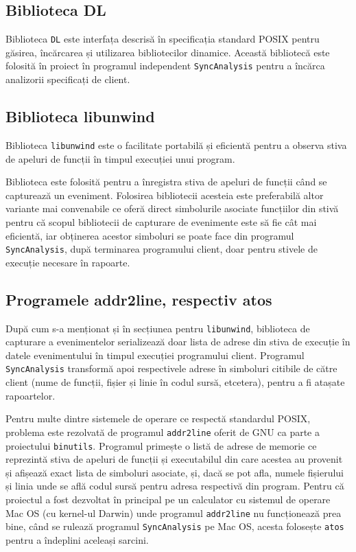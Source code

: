 \subsection{Biblioteca DL}

Biblioteca \lstinline{DL}\cite{DL} este interfața descrisă în
specificația standard POSIX pentru găsirea, încărcarea și utilizarea
bibliotecilor dinamice. Această bibliotecă este folosită în proiect în
programul independent \lstinline{SyncAnalysis} pentru a încărca
analizorii specificați de client.

\subsection{Biblioteca libunwind}

Biblioteca \lstinline{libunwind}\cite{libunwind} este o facilitate
portabilă și eficientă pentru a observa stiva de apeluri de funcții în
timpul execuției unui program.

Biblioteca este folosită pentru a înregistra stiva de apeluri de funcții
când se capturează un eveniment. Folosirea bibliotecii acesteia este
preferabilă altor variante mai convenabile ce oferă direct simbolurile
asociate funcțiilor din stivă pentru că scopul bibliotecii de capturare
de evenimente este să fie cât mai eficientă, iar obținerea acestor
simboluri se poate face din programul \lstinline{SyncAnalysis}, după
terminarea programului client, doar pentru stivele de execuție necesare
în rapoarte.

\subsection{Programele addr2line, respectiv atos}

După cum s-a menționat și în secțiunea pentru \lstinline{libunwind},
biblioteca de capturare a evenimentelor serializează doar lista de
adrese din stiva de execuție în datele evenimentului în timpul execuției
programului client. Programul \lstinline{SyncAnalysis} transformă apoi
respectivele adrese în simboluri citibile de către client (nume de
funcții, fișier și linie în codul sursă, etcetera), pentru a fi atașate
rapoartelor.

Pentru multe dintre sistemele de operare ce respectă standardul POSIX,
problema este rezolvată de programul \lstinline{addr2line} oferit de GNU
ca parte a proiectului \lstinline{binutils}\cite{binutils}. Programul
primește o listă de adrese de memorie ce reprezintă stiva de apeluri de
funcții și executabilul din care acestea au provenit și afișează exact
lista de simboluri asociate, și, dacă se pot afla, numele fișierului și
linia unde se află codul sursă pentru adresa respectivă din program.
Pentru că proiectul a fost dezvoltat în principal pe un calculator cu
sistemul de operare Mac OS (cu kernel-ul Darwin) unde programul
\lstinline{addr2line} nu funcționează prea bine, când se rulează
programul \lstinline{SyncAnalysis} pe Mac OS, acesta folosește
\lstinline{atos}\cite{atos} pentru a îndeplini aceleași sarcini.

